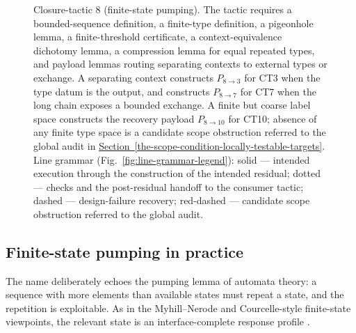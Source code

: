 \documentclass[
  11pt,
]{article}
\theoremstyle{definition}
\newcommand{\secref}[1]{\hyperref[#1]{Section~\ref*{#1}}}
\begin{document}
\begin{figure}[p]
{%
}
\caption[Closure-tactic 8: finite-state pumping]{Closure-tactic 8 (finite-state pumping).  The tactic requires a bounded-sequence definition, a finite-type definition, a pigeonhole lemma, a finite-threshold certificate, a context-equivalence dichotomy lemma, a compression lemma for equal repeated types, and payload lemmas routing separating contexts to external types or exchange.  A separating context constructs \(P_{8\to3}\) for CT3 when the type datum is the output, and constructs \(P_{8\to7}\) for CT7 when the long chain exposes a bounded exchange.  A finite but coarse label space constructs the recovery payload \(P_{8\to10}\) for CT10; absence of any finite type space is a candidate scope obstruction referred to the global audit in \secref{the-scope-condition-locally-testable-targets}.  Line grammar (Fig.~\ref{fig:line-grammar-legend}): solid --- intended execution through the construction of the intended residual; dotted --- checks and the post-residual handoff to the consumer tactic; dashed --- design-failure recovery; red-dashed --- candidate scope obstruction referred to the global audit.}
\label{fig:ct8-finite-state-pumping}
\end{figure}
\FloatBarrier

\subsection*{Finite-state pumping in practice}

The name deliberately echoes the pumping lemma of automata theory: a
sequence with more elements than available states must repeat a state,
and the repetition is exploitable. As in the Myhill--Nerode and
Courcelle-style finite-state viewpoints, the relevant state is an
interface-complete response profile
\citep{myhill-1957-automata, nerode-1958-linear, courcelle-1990-mso-graphs, courcelle-engelfriet-2012-graph-structure}.
\end{document}
